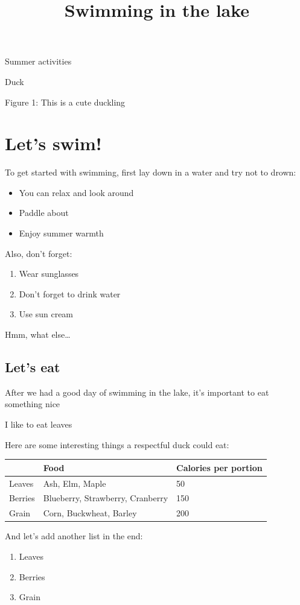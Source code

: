 \documentclass[11pt,a4paper]{article}
\title{Swimming in the lake}
\begin{document}
\maketitle

Summer activities

Duck

\begin{figure}[h]
\end{figure}

Figure 1: This is a cute duckling

\section{Let’s swim!}

To get started with swimming, first lay down in a water and try not to drown:

\begin{itemize}
\item You can relax and look around
\item Paddle about
\item Enjoy summer warmth
\end{itemize}

Also, don’t forget:

\begin{enumerate}
\item Wear sunglasses
\item Don’t forget to drink water
\item Use sun cream
\end{enumerate}

Hmm, what else…

\subsection{Let’s eat}

After we had a good day of swimming in the lake, it’s important to eat something nice

I like to eat leaves

Here are some interesting things a respectful duck could eat:

\begin{table}[h]
\begin{tabular}{|l|l|l|}
\hline
 & Food & Calories per portion \\ \hline
Leaves & Ash, Elm, Maple & 50 \\ \hline
Berries & Blueberry, Strawberry, Cranberry & 150 \\ \hline
Grain & Corn, Buckwheat, Barley & 200 \\ \hline
\end{tabular}
\end{table}

And let’s add another list in the end:

\begin{enumerate}
\item Leaves
\item Berries
\item Grain
\end{enumerate}
\end{document}
